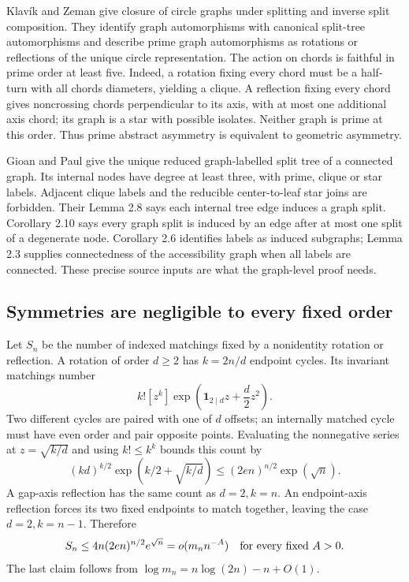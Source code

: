 \documentclass[11pt,letterpaper]{article}
\numberwithin{equation}{section}
\theoremstyle{definition}\newtheorem{definition}[theorem]{Definition}
\theoremstyle{remark}\newtheorem{remark}[theorem]{Remark}
\newcommand{\one}{\mathbf1}
\begin{document}
Klav\'ik and Zeman \cite[Section 3, Lemmas 7--8 and their
proofs]{KZ15} give closure of circle graphs under splitting and
inverse split composition. They identify graph automorphisms with
canonical split-tree automorphisms and describe prime graph
automorphisms as rotations or reflections of the unique circle
representation. The action on chords is faithful in prime order at
least five. Indeed, a rotation fixing every chord must be a
half-turn with all chords diameters, yielding a clique. A
reflection fixing every chord gives noncrossing chords perpendicular
to its axis, with at most one additional axis chord; its graph is
a star with possible isolates. Neither graph is prime at this order.
Thus prime abstract asymmetry is equivalent to geometric asymmetry.

Gioan and Paul \cite[Section 2.2, Theorem 2.9]{GP12} give the
unique reduced graph-labelled split tree of a connected graph.
Its internal nodes have degree at least three, with prime, clique
or star labels. Adjacent clique labels and the reducible
center-to-leaf star joins are forbidden. Their Lemma 2.8 says each
internal tree edge induces a graph split. Corollary 2.10 says every
graph split is induced by an edge after at most one split of a
degenerate node. Corollary 2.6 identifies labels as induced
subgraphs; Lemma 2.3 supplies connectedness of the accessibility
graph when all labels are connected. These precise source inputs
are what the graph-level proof needs.

\subsection{Symmetries are negligible to every fixed order}\label{cgr:fc:sub:symmetry}
Let $S_n$ be the number of indexed matchings fixed by a nonidentity
rotation or reflection. A rotation of order $d\ge2$ has
$k=2n/d$ endpoint cycles. Its invariant matchings number
\[
 k![z^k]\exp\left(\one_{2\mid d}z+\frac d2z^2\right).
\]
Two different cycles are paired with one of $d$ offsets; an
internally matched cycle must have even order and pair opposite
points. Evaluating the nonnegative series at $z=\sqrt{k/d}$ and
using $k!\le k^k$ bounds this count by
\[
 (kd)^{k/2}\exp(k/2+\sqrt{k/d})
 \le (2en)^{n/2}\exp(\sqrt n).
\]
A gap-axis reflection has the same count as $d=2,k=n$. An
endpoint-axis reflection forces its two fixed endpoints to match
together, leaving the case $d=2,k=n-1$. Therefore
\begin{equation}\label{cgr:fc:eq:symmetry}
 S_n\le4n(2en)^{n/2}e^{\sqrt n}=o(m_n n^{-A})
 \quad\hbox{for every fixed }A>0.
\end{equation}
The last claim follows from $\log m_n=n\log(2n)-n+O(1)$.
\end{document}
